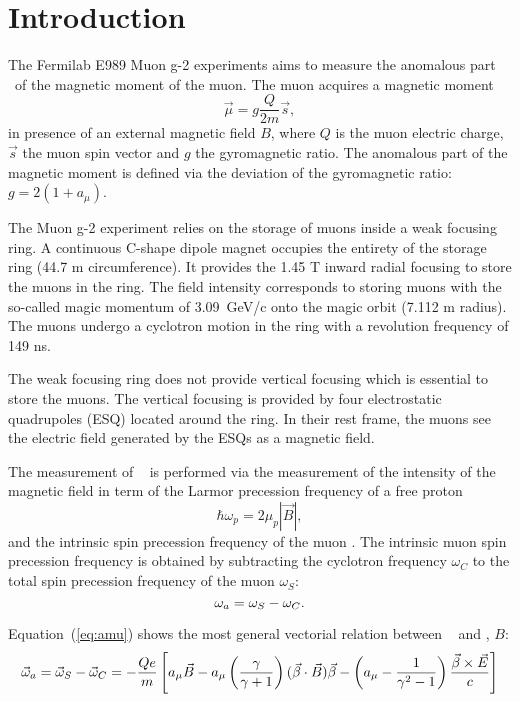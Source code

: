 \section{Introduction}

The Fermilab E989 Muon g-2 experiments aims to measure the anomalous part \amu\ of the magnetic moment of the muon.
The muon acquires a magnetic moment 
\begin{equation} 
\vec{\mu}=g \frac{Q}{2m} \vec{s},
\end{equation} in presence of an external magnetic field $B$, where $Q$ is the muon electric charge, $\vec{s}$ the muon spin vector 
and $g$  the gyromagnetic ratio. 
The anomalous part of the magnetic moment is defined via the deviation of the gyromagnetic ratio: $g = 2(1+a_\mu)$.

The Muon g-2 experiment relies on the storage of muons inside a weak focusing ring. 
A continuous C-shape dipole magnet occupies the entirety of the storage ring (44.7 m circumference). 
It provides the 1.45 T inward radial focusing to store the muons in the ring. 
The field intensity corresponds to storing muons with the so-called magic momentum of \mbox{3.09 GeV/c} onto the magic orbit (7.112 m radius).
The muons undergo a cyclotron motion in the ring with a revolution frequency of 149 ns.

The weak focusing ring does not provide vertical focusing which is essential to store the muons. 
The vertical focusing is provided by four electrostatic quadrupoles (ESQ) located around the ring.
In their rest frame, the muons see the electric field generated by the ESQs as a magnetic field.

The measurement of \amu~ is performed via the measurement of the intensity of the magnetic field in term of the Larmor precession frequency of a free proton 
\begin{equation}
\hbar \omega_{p} = 2 \mu_{p} | \overrightarrow{B}|,
\end{equation}
and the intrinsic spin precession frequency of the muon \wa. 
The intrinsic muon spin precession frequency is obtained by subtracting the cyclotron frequency $\omega_C$ to the total spin precession frequency of the muon $\omega_S$:
\begin{equation}
\mbox{\ensuremath{\omega_a}} = \omega_S - \omega_C.
\end{equation}

Equation~(\ref{eq:amu}) shows the most general vectorial relation between \amu~ and \wa, $B$:
\begin{equation}
\label{eq:amu}
\vec \omega_{a}=\vec \omega_S -\vec\omega_C 
=  - \frac{Qe}{ m}
\left[ a_{\mu} \vec B -  a_{\mu}\left( {\gamma \over \gamma + 1}\right)
(\vec \beta \cdot \vec B)\vec \beta 
- \left( a_{\mu}- {1 \over \gamma^2 - 1} \right) 
{ {\vec \beta \times \vec E }\over c }\right]
\end{equation}

